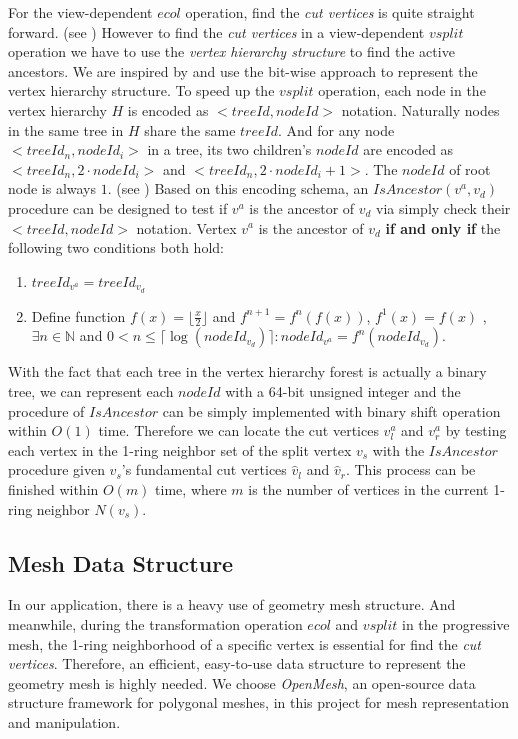 

For the view-dependent $ecol$ operation, find the \emph{cut vertices} is quite straight forward. (see ) However to find the \emph{cut vertices} in a view-dependent $vsplit$ operation we have to use the \emph{vertex hierarchy structure} to find the active ancestors. We are inspired by \cite{Kim:2001:trulyselective} and use the bit-wise approach to represent the vertex hierarchy structure. To speed up the $vsplit$ operation, each node in the vertex hierarchy $H$ is encoded as $<treeId,nodeId>$ notation. Naturally nodes in the same tree in $H$ share the same $treeId$. And for any node $<treeId_n,nodeId_i>$ in a tree, its two children's $nodeId$ are encoded as $<treeId_n,2\cdot nodeId_i>$ and $<treeId_n,2\cdot nodeId_i+1>$. The $nodeId$ of root node is always $1$. (see ) Based on this encoding schema, an $IsAncestor(v^a,v_d)$ procedure can be designed to test if $v^a$ is the ancestor of $v_d$ via simply check their $<treeId,nodeId>$ notation. Vertex $v^a$ is the ancestor of $v_d$ \textbf{if and only if} the following two conditions both hold:
\begin{enumerate}
\item
$treeId_{v^a}=treeId_{v_d}$
\item
Define function $f(x)=\lfloor\frac{x}{2}\rfloor$ and $f^{n+1}=f^n(f(x))$, $f^{1}(x)=f(x)$ , $\exists{n}\in\mathbb{N}$ and $0<n\le\lceil\log{(nodeId_{v_d})}\rceil:{nodeId_{v^a}}=f^n(nodeId_{v_d})$.
\end{enumerate}

With the fact that each tree in the vertex hierarchy forest is actually a binary tree, we can represent each $nodeId$ with a 64-bit unsigned integer and the procedure of $IsAncestor$ can be simply implemented with binary shift operation within $O(1)$ time. Therefore we can locate the cut vertices $v^a_l$ and $v^a_r$ by testing each vertex in the 1-ring neighbor set of the split vertex $v_s$ with the $IsAncestor$ procedure given $v_s$'s fundamental cut vertices $\hat{v}_l$ and $\hat{v}_r$. This process can be finished within $O(m)$ time, where $m$ is the number of vertices in the current 1-ring neighbor $N(v_s)$. 

\subsection{Mesh Data Structure}
\label{section:meshdatastruct}
In our application, there is a heavy use of geometry mesh structure. And meanwhile, during the transformation operation $ecol$ and $vsplit$ in the progressive mesh, the 1-ring neighborhood of a specific vertex is essential for find the \emph{cut vertices}. Therefore, an efficient, easy-to-use data structure to represent the geometry mesh is highly needed. We choose \emph{OpenMesh}\cite{Botsch02openmesh}, an open-source data structure framework for polygonal meshes, in this project for mesh representation and manipulation.

